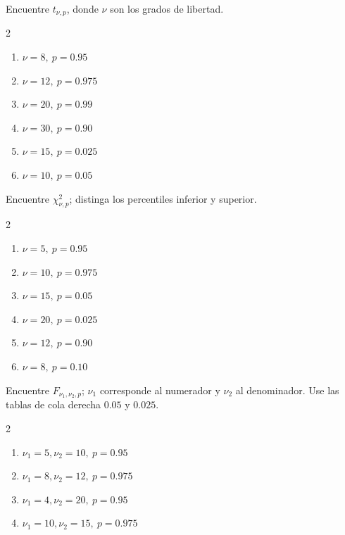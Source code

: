 \documentclass[
  spanish,
  12pt,
  letterpaper]{article}
\begin{document}
\par\vspace{3pt}

Encuentre \(t_{\nu,p}\), donde \(\nu\) son los grados de libertad.

\begin{multicols}{2}
\begin{enumerate}[label=\alph*)]
\item $\nu=8,\ p=0.95$
\item $\nu=12,\ p=0.975$
\item $\nu=20,\ p=0.99$
\item $\nu=30,\ p=0.90$
\item $\nu=15,\ p=0.025$
\item $\nu=10,\ p=0.05$
\end{enumerate}
\end{multicols}

\par\vspace{3pt}

Encuentre \(\chi^2_{\nu,p}\); distinga los percentiles inferior y
superior.

\begin{multicols}{2}
\begin{enumerate}[label=\alph*)]
\item $\nu=5,\ p=0.95$
\item $\nu=10,\ p=0.975$
\item $\nu=15,\ p=0.05$
\item $\nu=20,\ p=0.025$
\item $\nu=12,\ p=0.90$
\item $\nu=8,\ p=0.10$
\end{enumerate}
\end{multicols}

\par\vspace{3pt}

Encuentre \(F_{\nu_1,\nu_2,p}\); \(\nu_1\) corresponde al numerador y
\(\nu_2\) al denominador. Use las tablas de cola derecha \(0.05\) y
\(0.025\).

\begin{multicols}{2}
\begin{enumerate}[label=\alph*)]
\item $\nu_1=5,\nu_2=10,\ p=0.95$
\item $\nu_1=8,\nu_2=12,\ p=0.975$
\item $\nu_1=4,\nu_2=20,\ p=0.95$
\item $\nu_1=10,\nu_2=15,\ p=0.975$
\end{enumerate}
\end{multicols}
\end{document}
